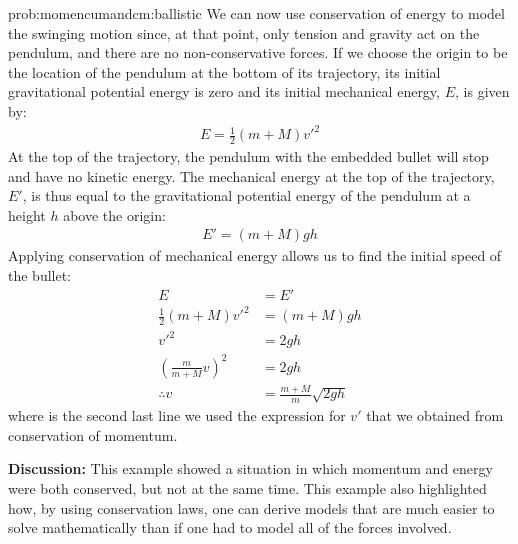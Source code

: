 \begin{solution}{prob:momencumandcm:ballistic}
We can now use conservation of energy to model the swinging motion since, at that point, only tension and gravity act on the pendulum, and there are no non-conservative forces. If we choose the origin to be the location of the pendulum at the bottom of its trajectory, its initial gravitational potential energy is zero and its initial mechanical energy, $E$, is given by:
\begin{align*}
E = \frac{1}{2}(m+M) v'^2 
\end{align*}
At the top of the trajectory, the pendulum with the embedded bullet will stop and have no kinetic energy. The mechanical energy at the top of the trajectory, $E'$, is thus equal to the gravitational potential energy of the pendulum at a height $h$ above the origin:
\begin{align*}
E' = (m+M)gh
\end{align*}
Applying conservation of mechanical energy allows us to find the initial speed of the bullet:
\begin{align*}
E &= E'\\
\frac{1}{2}(m+M) v'^2 &= (m+M)gh\\
v'^2 &= 2gh\\
\left( \frac{m}{m+M}v\right)^2&= 2gh\\
\therefore v &= \frac{m+M}{m} \sqrt{2gh}
\end{align*}
where is the second last line we used the expression for $v'$ that we obtained from conservation of momentum.

\textbf{Discussion: }This example showed a situation in which momentum and energy were both conserved, but not at the same time. This example also highlighted how, by using conservation laws, one can derive models that are much easier to solve mathematically than if one had to model all of the forces involved.
\end{solution}


